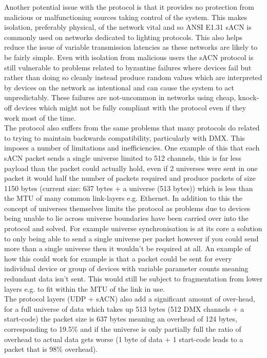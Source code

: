 \documentclass[11pt,a4paper]{article}
\begin{document}
Another potential issue with the protocol is that it provides no protection from malicious or malfunctioning sources taking control of the system. This makes isolation, preferably physical, of the network vital and so ANSI E1.31 sACN is commonly used on networks dedicated to lighting protocols. This also helps reduce the issue of variable transmission latencies as these networks are likely to be fairly simple. Even with isolation from malicious users the sACN protocol is still vulnerable to problems related to byzantine failures where devices fail but rather than doing so cleanly instead produce random values which are interpreted by devices on the network as intentional and can cause the system to act unpredictably. These failures are not-uncommon in networks using cheap, knock-off devices which might not be fully compliant with the protocol even if they work most of the time.\\

The protocol also suffers from the same problems that many protocols do related to trying to maintain backwards compatibility, particularly with DMX. This imposes a number of limitations and inefficiencies. One example of this that each sACN packet sends a single universe limited to 512 channels, this is far less payload than the packet could actually hold, even if 2 universes were sent in one packet it would half the number of packets required and produce packets of size 1150 bytes (current size: 637 bytes + a universe (513 bytes)) which is less than the MTU of many common link-layers e.g. Ethernet. In addition to this the concept of universes themselves limits the protocol as problems due to devices being unable to lie across universe boundaries have been carried over into the protocol and solved. For example universe synchronisation is at its core a solution to only being able to send a single universe per packet however if you could send more than a single universe then it wouldn't be required at all. An example of how this could work for example is that a packet could be sent for every individual device or group of devices with variable parameter counts meaning redundant data isn't sent. This would still be subject to fragmentation from lower layers e.g. to fit within the MTU of the link in use.\\

The protocol layers (UDP + sACN) also add a significant amount of over-head, for a full universe of data which takes up 513 bytes (512 DMX channels + a start-code) the packet size is 637 bytes meaning an overhead of 124 bytes, corresponding to 19.5\% and if the universe is only partially full the ratio of overhead to actual data gets worse (1 byte of data + 1 start-code leads to a packet that is 98\% overhead).\\
\end{document}

